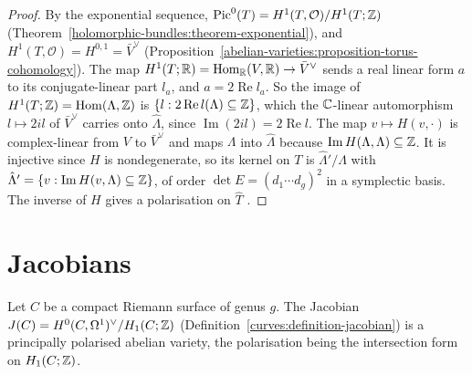 \begin{proof}
By the exponential sequence, $\operatorname{Pic}^0(T) = H^1(T, \mathcal{O})/H^1(T; \mathbb{Z})$ (Theorem~\ref{holomorphic-bundles:theorem-exponential}), and $H^1(T, \mathcal{O}) = H^{0,1} = \bar V^\vee$
(Proposition~\ref{abelian-varieties:proposition-torus-cohomology}). The map $H^1(T; \mathbb{R}) = \operatorname{Hom}_{\mathbb{R}}(V, \mathbb{R}) \to \bar V^\vee$ sends a real linear form $a$ to its conjugate-linear part
$l_a$, and $a = 2\operatorname{Re}l_a$. So the image of $H^1(T; \mathbb{Z}) = \operatorname{Hom}(\Lambda, \mathbb{Z})$ is $\{l : 2\operatorname{Re}l(\Lambda) \subseteq \mathbb{Z}\}$, which the $\mathbb{C}$-linear automorphism
$l \mapsto 2il$ of $\bar V^\vee$ carries onto $\hat\Lambda$, since $\operatorname{Im}(2il) = 2\operatorname{Re}l$. The map
$v \mapsto H(v, \cdot)$ is complex-linear from $V$ to $\bar V^\vee$ and maps $\Lambda$ into $\hat\Lambda$ because $\operatorname{Im}H(\Lambda, \Lambda) \subseteq \mathbb{Z}$. It is injective since
$H$ is nondegenerate, so its kernel on $T$ is $\hat\Lambda'/\Lambda$ with $\hat\Lambda' = \{v : \operatorname{Im}H(v, \Lambda) \subseteq \mathbb{Z}\}$, of order $\det E = (d_1 \cdots d_g)^2$ in
a symplectic basis. The inverse of $H$ gives a polarisation on $\hat T$ \cite{birkenhake-lange}.
\end{proof}

\section{Jacobians}\label{abelian-varieties:section-jacobians}

\begin{theorem}\label{abelian-varieties:theorem-jacobian}
Let $C$ be a compact Riemann surface of genus $g$. The Jacobian $J(C) = H^0(C, \Omega^1)^\vee/H_1(C; \mathbb{Z})$ (Definition~\ref{curves:definition-jacobian}) is a principally
polarised abelian variety, the polarisation being the intersection form on $H_1(C; \mathbb{Z})$.
\end{theorem}

